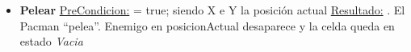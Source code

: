 \begin{itemize}
\item \textbf{Pelear}\newline
\underline{PreCondicion:}  = true; siendo X e Y la posición actual\newline
\underline{Resultado:} . El Pacman ``pelea''. Enemigo en posicionActual desaparece
y la celda queda en estado \textit{Vacia}

\end{itemize}
